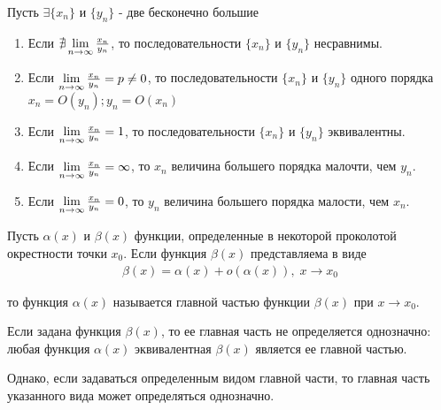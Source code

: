 \documentclass{article}
\begin{document}
Пусть $\exists \{x_n\}$ и $\{y_n\}$ - две бесконечно большие
\begin{enumerate}
	\item{}Если $\nexists \lim\limits_{n \to \infty}\frac{x_n}{y_n}$, то последовательности $\{x_n\}$ и $\{y_n\}$ несравнимы.
	\item{}Если $\lim\limits_{n \to \infty}\frac{x_n}{y_n}=p\neq 0$, то последовательности $\{x_n\}$ и $\{y_n\}$ одного порядка $x_n=O(y_n);y_n=O(x_n)$
	\item{}Если $ \lim\limits_{n \to \infty}\frac{x_n}{y_n}=1$, то последовательности $\{x_n\}$ и $\{y_n\}$ эквивалентны.
	\item{}Если $ \lim\limits_{n \to \infty}\frac{x_n}{y_n}=\infty$, то $x_n$ величина большего порядка малочти, чем $y_n$.
	\item{}Если $ \lim\limits_{n \to \infty}\frac{x_n}{y_n}=0$, то $y_n$ величина большего порядка малости, чем $x_n$.
\end{enumerate}


Пусть  $\alpha(x)$ и $\beta (x)$ функции, определенные в некоторой проколотой окрестности точки $x_0$. Если функция  $\beta(x)$ представляема в виде
\begin{align*}
	\beta(x) = \alpha(x)+o(\alpha(x)), \; x \to x_0
\end{align*}

то функция  $\alpha(x)$ называется главной частью функции $\beta(x)$ при $x \to x_0$.

Если задана функция  $\beta(x)$, то ее главная часть не определяется однозначно: любая функция $\alpha(x)$ эквивалентная $\beta(x)$ является ее главной частью.

Однако, если задаваться определенным видом главной части, то главная часть указанного вида может определяться однозначно.
\end{document}
